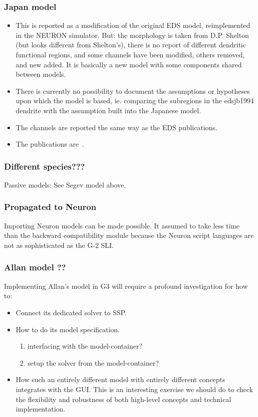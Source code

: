 \documentclass[12pt]{article}
\begin{document}
\subsubsection{Japan model}
\begin{itemize}
\item This is reported as a modification of the original EDS model,
  reimplemented in the NEURON simulator.  But: the morphology is taken
  from D.P. Shelton (but looks different from Shelton's), there is no
  report of different dendritic functional regions, and some channels
  have been modified, others removed, and new added.  It is basically
  a new model with some components shared between models.
\item There is currently no possibility to document the assumptions or
  hypotheses upon which the model is based, ie. comparing the
  subregions in the edsjb1994 dendrite with the assumption built into
  the Japanese model.
\item The channels are reported the same way as the EDS publications.
\item The publications are~\cite{miyasho01:_low_ca2_purkin,
    chono03:_purkin}.
\end{itemize}

\subsubsection{Different species???}
Passive models: See Segev model above.


\subsubsection{Propagated to Neuron}
Importing Neuron models can be made possible.  It assumed to take less
time than the backward compatibility module because the Neuron script
languages are not as sophisticated as the G-2 SLI.

\subsubsection{Allan model ??}
Implementing Allan's model in G3 will require a profound investigation
for how to:
\begin{itemize}
\item Connect its dedicated solver to SSP.
\item How to do its model specification.
  \begin{enumerate}
  \item interfacing with the model-container?
  \item setup the solver from the model-container?
  \end{enumerate}
\item How such an entirely different model with entirely different
  concepts integrates with the GUI.  This is an interesting exercise
  we should do to check the flexibility and robustness of both
  high-level concepts and technical implementation.
\end{itemize}
\end{document}
